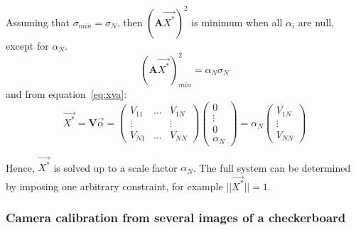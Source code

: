 \begin{algorithm}[!ht]
\begin{algorithmic}[1]
      \STATE Assuming that \(\sigma_{min} = \sigma_N\), then \((\textbf{A}\overrightarrow{X^*})^2\) is minimum when all $\alpha_i$ are null, except for $\alpha_N$.
      \begin{equation}
          (\textbf{A} \overrightarrow{X^*})_{min}^2 = \alpha_N \sigma_N
      \end{equation}
      and from equation~\ref{eq:xva}:
      \begin{equation}
          \overrightarrow{X^*} = 
          \textbf{V} \overrightarrow{\alpha} 
          = \begin{pmatrix} V_{11} & \dots & V_{1N} \\
           \vdots &  & \vdots \\
          V_{N1} & \dots & V_{NN}\end{pmatrix} \begin{pmatrix}0 \\ \vdots \\0 \\\alpha_N\end{pmatrix} 
          = \alpha_N \begin{pmatrix}V_{1N} \\ \vdots \\V_{NN}\end{pmatrix} 
      \end{equation} 
  
      \STATE Hence, $\overrightarrow{X^*}$ is solved up to a scale factor $\alpha_N$. The full system can be determined by imposing one arbitrary constraint, for example $||\overrightarrow{X^*}||=1$. 
  \end{algorithmic}
\end{algorithm}


\newpage
\subsubsection{Camera calibration from several images of a checkerboard} 

